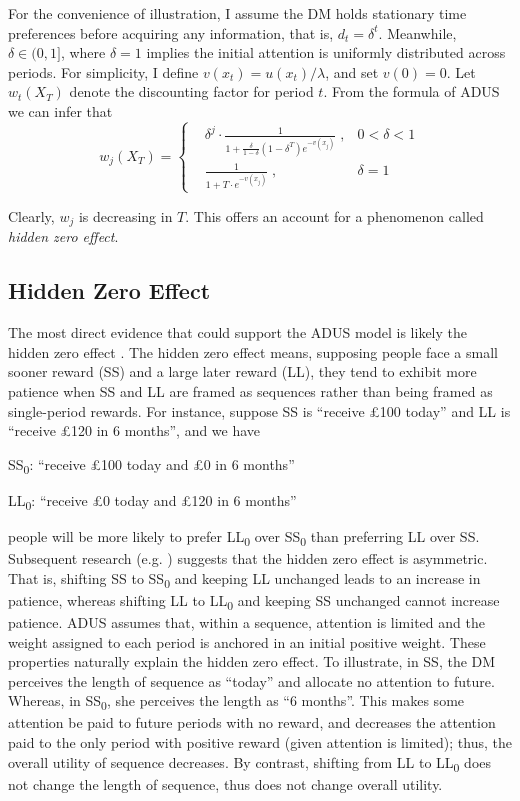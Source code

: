 \documentclass[
  12pt,
]{article}
\begin{document}
For the convenience of illustration, I assume the DM holds stationary
time preferences before acquiring any information, that is,
\(d_t=\delta^t\). Meanwhile, \(\delta\in(0,1]\), where \(\delta=1\)
implies the initial attention is uniformly distributed across periods.
For simplicity, I define \(v(x_t)=u(x_t)/\lambda\), and set \(v(0)=0\).
Let \(w_t(X_T)\) denote the discounting factor for period \(t\). From
the formula of ADUS we can infer that\[ 
w_j(X_T) = \left\{ \begin{aligned}
& \delta^j \cdot\frac{1}{1+\frac{\delta}{1-\delta}(1-\delta^T)e^{-v(x_j)}}\;, & 0<\delta<1 \\
& \frac{1}{1+T\cdot e^{-v(x_j)}}\; , & \delta=1
\end{aligned}
\right.
\]

Clearly, \(w_j\) is decreasing in \(T\). This offers an account for a
phenomenon called \emph{hidden zero effect}.

\hypertarget{hidden-zero-effect}{%
\subsection{Hidden Zero Effect}\label{hidden-zero-effect}}

The most direct evidence that could support the ADUS model is likely the
hidden zero effect \citep{magen_hidden-zero_2008}. The hidden zero
effect means, supposing people face a small sooner reward (SS) and a
large later reward (LL), they tend to exhibit more patience when SS and
LL are framed as sequences rather than being framed as single-period
rewards. For instance, suppose SS is ``receive £100 today'' and LL is
``receive £120 in 6 months'', and we have

SS\textsubscript{0}: ``receive £100 today and £0 in 6 months''

LL\textsubscript{0}: ``receive £0 today and £120 in 6 months''

people will be more likely to prefer LL\textsubscript{0} over
SS\textsubscript{0} than preferring LL over SS. Subsequent research
(e.g. \citet{read_value_2017}) suggests that the hidden zero effect is
asymmetric. That is, shifting SS to SS\textsubscript{0} and keeping LL
unchanged leads to an increase in patience, whereas shifting LL to
LL\textsubscript{0} and keeping SS unchanged cannot increase patience.
ADUS assumes that, within a sequence, attention is limited and the
weight assigned to each period is anchored in an initial positive
weight. These properties naturally explain the hidden zero effect. To
illustrate, in SS, the DM perceives the length of sequence as ``today''
and allocate no attention to future. Whereas, in SS\textsubscript{0},
she perceives the length as ``6 months''. This makes some attention be
paid to future periods with no reward, and decreases the attention paid
to the only period with positive reward (given attention is limited);
thus, the overall utility of sequence decreases. By contrast, shifting
from LL to LL\textsubscript{0} does not change the length of sequence,
thus does not change overall utility.
\end{document}
